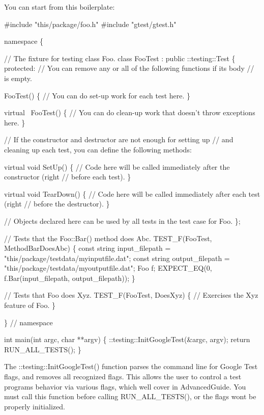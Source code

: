You can start from this boilerplate\+: 
\begin{DoxyCode}
#include "this/package/foo.h"
#include "gtest/gtest.h"

namespace \{

// The fixture for testing class Foo.
class FooTest : public ::testing::Test \{
 protected:
  // You can remove any or all of the following functions if its body
  // is empty.

  FooTest() \{
    // You can do set-up work for each test here.
  \}

  virtual ~FooTest() \{
    // You can do clean-up work that doesn't throw exceptions here.
  \}

  // If the constructor and destructor are not enough for setting up
  // and cleaning up each test, you can define the following methods:

  virtual void SetUp() \{
    // Code here will be called immediately after the constructor (right
    // before each test).
  \}

  virtual void TearDown() \{
    // Code here will be called immediately after each test (right
    // before the destructor).
  \}

  // Objects declared here can be used by all tests in the test case for Foo.
\};

// Tests that the Foo::Bar() method does Abc.
TEST\_F(FooTest, MethodBarDoesAbc) \{
  const string input\_filepath = "this/package/testdata/myinputfile.dat";
  const string output\_filepath = "this/package/testdata/myoutputfile.dat";
  Foo f;
  EXPECT\_EQ(0, f.Bar(input\_filepath, output\_filepath));
\}

// Tests that Foo does Xyz.
TEST\_F(FooTest, DoesXyz) \{
  // Exercises the Xyz feature of Foo.
\}

\}  // namespace

int main(int argc, char **argv) \{
  ::testing::InitGoogleTest(&argc, argv);
  return RUN\_ALL\_TESTS();
\}
\end{DoxyCode}


The {\ttfamily \+::testing\+::\+Init\+Google\+Test()} function parses the command line for Google Test flags, and removes all recognized flags. This allows the user to control a test program\textquotesingle{}s behavior via various flags, which we\textquotesingle{}ll cover in Advanced\+Guide. You must call this function before calling {\ttfamily R\+U\+N\+\_\+\+A\+L\+L\+\_\+\+T\+E\+S\+T\+S()}, or the flags won\textquotesingle{}t be properly initialized.

